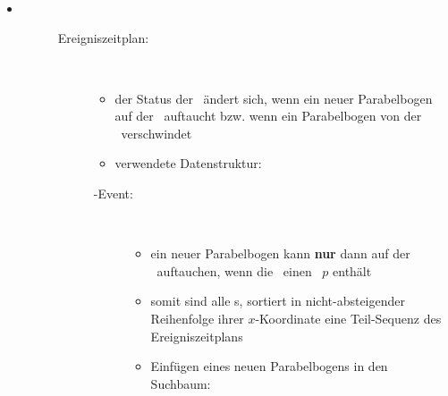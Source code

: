 \begin{itemize}
\begin{description}
\begin{description}
{\begin{minipage}{0.5\textwidth}
						\end{minipage}\\
						\begin{minipage}{0.4\textwidth}
						\resizebox{\textwidth}{!}{
							}
						\end{minipage}
						\hfill
						\begin{minipage}{0.5\textwidth}
						\resizebox{0.8\textwidth}{!}{
							}
						\end{minipage}\\\ \\
						}
				\end{description}
		\end{description}
\end{itemize}
\topbreak
\up\up
\begin{itemize}
	\item[] \begin{description}
			\item[]\ \\\up\up \begin{description}
					\item[Ereigniszeitplan:]\ \\\up
						\begin{itemize}
							\item der Status der \sweep~ändert sich, wenn ein neuer Parabelbogen auf der \beach~auftaucht bzw. wenn ein Parabelbogen von der \beach~verschwindet
							\item verwendete Datenstruktur: \PQ
						\end{itemize}
						\begin{description}
							\item[\site-Event:]\ \\\up
								\begin{minipage}{0.5\textwidth}
									\begin{itemize}
										\item ein neuer Parabelbogen kann \textbf{nur} dann auf der \beach~auftauchen, wenn die \sweep~einen \site~$p$ enthält
										\item somit sind alle \site s, sortiert in nicht-absteigender Reihenfolge ihrer $x$-Koordinate eine Teil-Sequenz des Ereigniszeitplans
										\item Einfügen eines neuen Parabelbogens in den Suchbaum:
									\end{itemize}
								\end{minipage}\hfill
								\begin{minipage}{0.3\textwidth}

\end{minipage}
\end{description}
\end{description}
\end{description}
\end{itemize}
